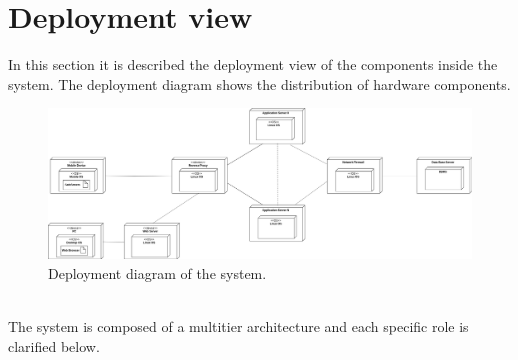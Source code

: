 \documentclass{report}
\begin{document}
\section{Deployment view}
In this section it is described the deployment view of the components inside the system. The deployment diagram shows the distribution of hardware components.
\begin{figure}[!ht]
	\begin{center}
	\includegraphics[width=\textwidth]{img/DeploymentView.png}
    \end{center}
    \label{fig:deploymentview}
	\caption{Deployment diagram of the system.}
\end{figure}\\
The system is composed of a multitier architecture and each specific role is clarified below.\\
\end{document}
